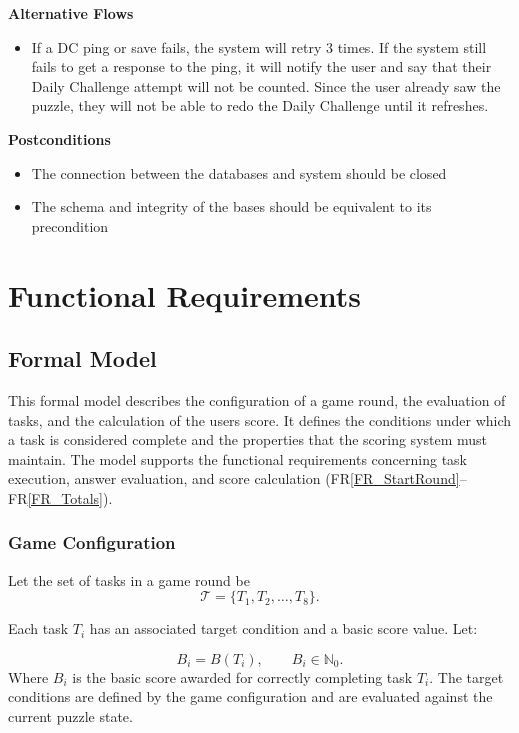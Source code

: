 \documentclass[12pt]{article}
\newcommand{\rref}[1]{FR\ref{#1}}
\begin{document}
\textbf{Alternative Flows}
\begin{itemize}
\item If a DC ping or save fails, the system will retry 3 times. If the system still fails to get a response to the ping, it will notify the user and say that their Daily Challenge attempt will not be counted. Since the user already saw the puzzle, they will not be able to redo the Daily Challenge until it refreshes.
\end{itemize}

\textbf{Postconditions}
\begin{itemize}
\item The connection between the databases and system should be closed
\item The schema and integrity of the bases should be equivalent to its precondition 
\end{itemize}

\section{Functional Requirements}

\subsection{Formal Model}
\label{sec:formal-model}

This formal model describes the configuration of a game round, the
evaluation of tasks, and the calculation of the users score. It
defines the conditions under which a task is considered complete and
the properties that the scoring system must maintain. The model
supports the functional requirements concerning task execution,
answer evaluation, and score calculation (\rref{FR_StartRound}--\rref{FR_Totals}).

\subsubsection{Game Configuration}

Let the set of tasks in a game round be
\[
    \mathcal{T} = \{T_1,T_2,\ldots,T_8\}.
\]

Each task \(T_i\) has an associated target condition and a basic
score value. 
Let:

\[
    B_i = B(T_i), \qquad B_i \in \mathbb{N}_0.
\]
Where \(B_i\) is the basic score awarded for correctly
completing task \(T_i\). The target conditions are defined by the
game configuration and are evaluated against the current puzzle
state.
\end{document}
